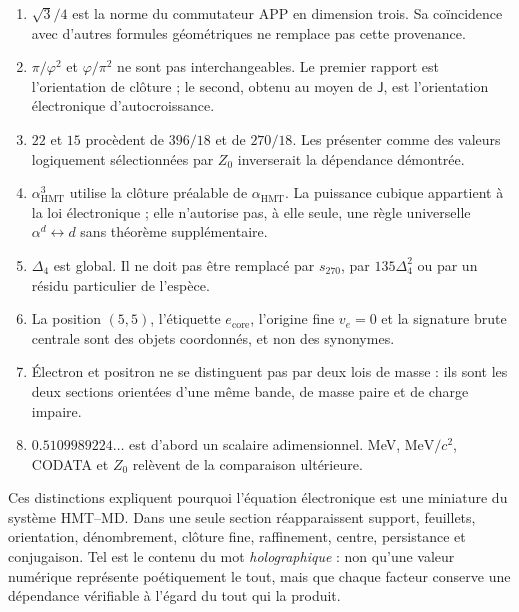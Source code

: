 \begin{enumerate}
\item \(\sqrt3/4\) est la norme du commutateur APP en dimension trois. Sa
coïncidence avec d'autres formules géométriques ne remplace pas cette provenance.

\item \(\pi/\varphi^2\) et \(\varphi/\pi^2\) ne sont pas interchangeables. Le
premier rapport est l'orientation de clôture ; le second, obtenu au moyen de
\(\mathsf J\), est l'orientation électronique d'autocroissance.

\item \(22\) et \(15\) procèdent de \(396/18\) et de \(270/18\).
Les présenter comme des valeurs logiquement sélectionnées par \(Z_0\) inverserait
la dépendance démontrée.

\item \(\alpha_{\mathrm{HMT}}^3\) utilise la clôture préalable de
\(\alpha_{\mathrm{HMT}}\). La puissance cubique appartient à la loi
électronique ; elle n'autorise pas, à elle seule, une règle universelle
\(\alpha^d\leftrightarrow d\) sans théorème supplémentaire.

\item \(\Delta_4\) est global. Il ne doit pas être remplacé par
\(s_{270}\), par \(135\Delta_4^2\) ou par un résidu particulier de
l'espèce.

\item La position \((5,5)\), l'étiquette \(e_{\mathrm{core}}\), l'origine
fine \(v_e=0\) et la signature brute centrale sont des objets coordonnés, et non
des synonymes.

\item Électron et positron ne se distinguent pas par deux lois de masse : ils sont les
deux sections orientées d'une même bande, de masse paire et de charge impaire.

\item \(0.5109989224\ldots\) est d'abord un scalaire adimensionnel. MeV,
\(\mathrm{MeV}/c^2\), CODATA et \(Z_0\) relèvent de la comparaison
ultérieure.
\end{enumerate}

Ces distinctions expliquent pourquoi l'équation électronique est une
miniature du système HMT--MD. Dans une seule section réapparaissent support,
feuillets, orientation, dénombrement, clôture fine, raffinement, centre, persistance
et conjugaison. Tel est le contenu du mot \emph{holographique} : non
qu'une valeur numérique représente poétiquement le tout, mais que chaque facteur
conserve une dépendance vérifiable à l'égard du tout qui la produit.
